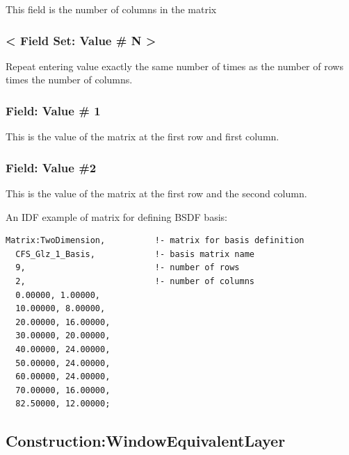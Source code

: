 This field is the number of columns in the matrix

\subsubsection{\textless{} Field Set: Value \# N \textgreater{}}\label{field-set-value-n}

Repeat entering value exactly the same number of times as the number of rows times the number of columns.

\subsubsection{Field: Value \# 1}\label{field-value-1-000}

This is the value of the matrix at the first row and first column.

\subsubsection{Field: Value \#2}\label{field-value-2}

This is the value of the matrix at the first row and the second column.

An IDF example of matrix for defining BSDF basis:

\begin{lstlisting}
Matrix:TwoDimension,          !- matrix for basis definition
  CFS_Glz_1_Basis,            !- basis matrix name
  9,                          !- number of rows
  2,                          !- number of columns
  0.00000, 1.00000,
  10.00000, 8.00000,
  20.00000, 16.00000,
  30.00000, 20.00000,
  40.00000, 24.00000,
  50.00000, 24.00000,
  60.00000, 24.00000,
  70.00000, 16.00000,
  82.50000, 12.00000;
\end{lstlisting}

\subsection{Construction:WindowEquivalentLayer}\label{constructionwindowequivalentlayer}

